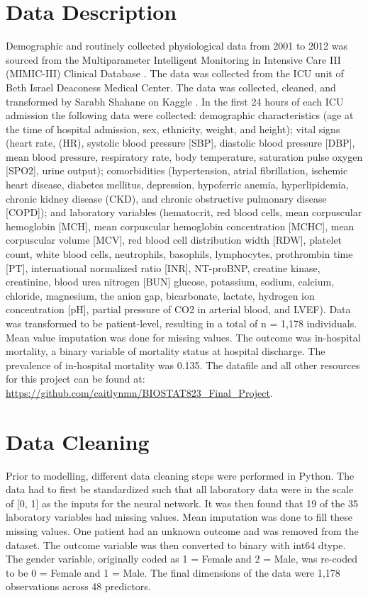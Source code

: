 \documentclass[10pt]{article}
\begin{document}
\begin{multicols}{2}
\section{Data Description}
Demographic and routinely collected physiological data from 2001 to 2012 was sourced from the Multiparameter Intelligent Monitoring in Intensive Care III (MIMIC-III) Clinical Database \cite{3}. The data was collected from the ICU unit of Beth Israel Deaconess Medical Center.  The data was collected, cleaned, and transformed by Sarabh Shahane on Kaggle \cite{4}. In the first 24 hours of each ICU admission the following data were collected: demographic characteristics (age at the time of hospital admission, sex, ethnicity, weight, and height); vital signs (heart rate, (HR), systolic blood pressure [SBP], diastolic blood pressure [DBP], mean blood pressure, respiratory rate, body temperature, saturation pulse oxygen [SPO2], urine output); comorbidities (hypertension, atrial fibrillation, ischemic heart disease, diabetes mellitus, depression, hypoferric anemia, hyperlipidemia, chronic kidney disease (CKD), and chronic obstructive pulmonary disease [COPD]); and laboratory variables (hematocrit, red blood cells, mean corpuscular hemoglobin [MCH], mean corpuscular hemoglobin concentration [MCHC], mean corpuscular volume [MCV], red blood cell distribution width [RDW], platelet count, white blood cells, neutrophils, basophils, lymphocytes, prothrombin time [PT], international normalized ratio [INR], NT-proBNP, creatine kinase, creatinine, blood urea nitrogen [BUN] glucose, potassium, sodium, calcium, chloride, magnesium, the anion gap, bicarbonate, lactate, hydrogen ion concentration [pH], partial pressure of CO2 in arterial blood, and LVEF). Data was transformed to be patient-level, resulting in a total of n = 1,178 individuals. Mean value imputation was done for missing values. The outcome was in-hospital mortality, a binary variable of mortality status at hospital discharge. The prevalence of in-hospital mortality was 0.135. The datafile and all other resources for this project can be found at: \url{https://github.com/caitlynmn/BIOSTAT823_Final_Project}.
 
\section{Data Cleaning}
Prior to modelling, different data cleaning steps were performed in Python. The data had to first be standardized such that all laboratory data were in the scale of [0, 1] as the inputs for the neural network. It was then found that 19 of the 35 laboratory variables had missing values. Mean imputation was done to fill these missing values. One patient had an unknown outcome and was removed from the dataset. The outcome variable was then converted to binary with int64 dtype. The gender variable, originally coded as 1 = Female and 2 = Male, was re-coded to be 0 = Female and 1 = Male. The final dimensions of the data were 1,178 observations across 48 predictors.


\end{multicols}
\end{document}
